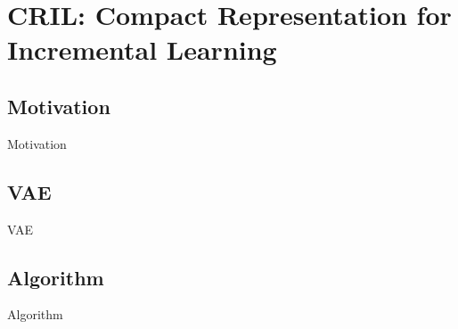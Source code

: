 
\section{CRIL: Compact Representation for Incremental Learning}
\label{sec:cril}

\subsection{Motivation}
\label{sec:motivation}
Motivation

\subsection{VAE}
\label{sec:vae}
VAE

\subsection{Algorithm} %
\label{sec:algorithm}
Algorithm
